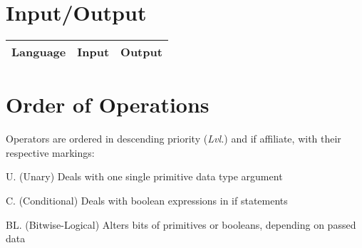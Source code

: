 \documentclass{article}
\begin{document}
\setlength{\tabcolsep}{1pt}
\renewcommand{\arraystretch}{1}
\section{Input/Output}
\begin{center}\begin{tabularx}{\textwidth}{cXX}\toprule
  Language & Input & Output \\ \midrule
\bottomrule\end{tabularx}\end{center}

\section{Order of Operations} 
Operators are ordered in descending priority (\textit{Lvl.}) and if affiliate, with their respective markings:

U. (Unary) \dotfill Deals with one single primitive data type argument

C. (Conditional) \dotfill Deals with boolean expressions in if statements

BL. (Bitwise-Logical) \dotfill Alters bits of primitives or booleans, depending on passed data
\end{document}
